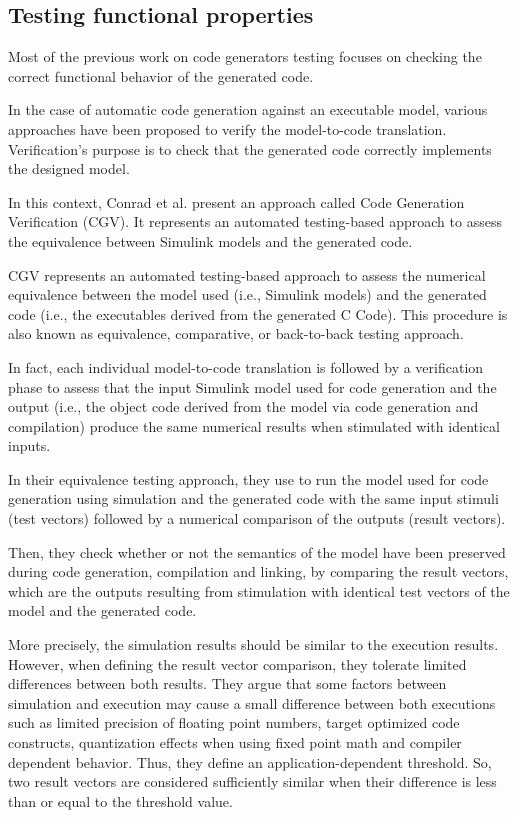 \subsection{Testing functional properties}

Most of the previous work on code generators testing focuses on checking the correct functional behavior of the generated code\cite{stuermer2007systematic,zelenov2006automatic,conrad2009testing,conrad2010code,jorges2014back}.

In the case of automatic code generation against an executable model, various approaches have been proposed to verify the model-to-code translation. Verification's purpose is to check that the generated code correctly implements the designed model.

In this context, Conrad et al.\cite{conrad2010code,conrad2009testing} present an approach called Code Generation Verification (CGV). It represents an automated testing-based approach to assess the equivalence between Simulink models and the generated code. 

CGV represents an automated testing-based approach to assess the numerical equivalence between the model used (i.e., Simulink models) and the generated code (i.e., the executables derived from the generated C Code). This procedure is also known as equivalence, comparative, or back-to-back testing approach\cite{vouk1990back,mckeeman1998differential}.

In fact, each individual model-to-code translation is followed by a verification phase to assess that the input Simulink model used for code generation and the output (i.e., the object code derived from the model via code generation and compilation) produce the same numerical results when stimulated with identical inputs. 

In their equivalence testing approach, they use to run the model used for code generation using simulation and the generated code with the same input stimuli (test vectors) followed by a numerical comparison of the outputs (result vectors).

Then, they check whether or not the semantics of the model have been preserved during code generation, compilation and linking, by comparing the result vectors, which are the outputs resulting from stimulation with identical test vectors of the model and the generated code.

More precisely, the simulation results should be similar to the execution results. However, when defining the result vector comparison, they tolerate limited differences between both results. They argue that some factors between simulation and execution may cause a small difference between both executions such as limited precision of floating point numbers, target optimized code constructs, quantization effects when using fixed point math and compiler dependent behavior. 
Thus, they define an application-dependent threshold. So, two result vectors are considered sufficiently similar when their difference is less than or equal to the threshold value.

